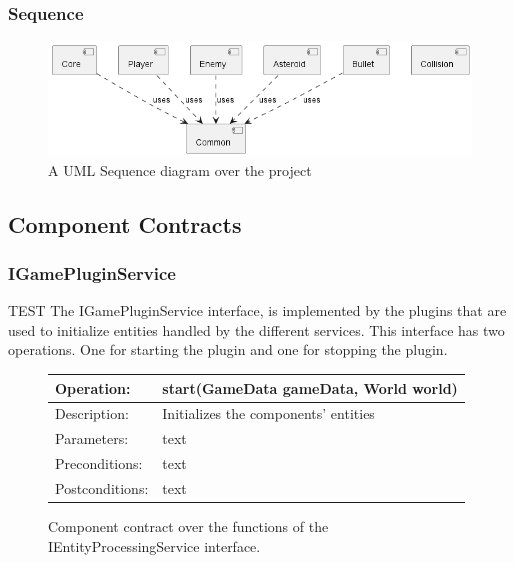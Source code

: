 \subsubsection{Sequence}
\begin{figure}
    \includegraphics[width=\textwidth]{images/diagrams/component.png}
    \caption{A UML Sequence diagram over the project}
\end{figure}

\subsection{Component Contracts}
\subsubsection{IGamePluginService}
TEST
The IGamePluginService interface, is implemented by the plugins that are used to initialize entities handled by the different services.
This interface has two operations. One for starting the plugin and one for stopping the plugin.
\begin{figure}
    \begin{center}
        \begin{tabulary}{1.0\textwidth}{lL}
            \toprule
            Operation:      & start(GameData gameData, World world) \\
            \midrule
            Description:     & Initializes the components' entities  \\
            \midrule
            Parameters:      & text                                  \\
            \midrule
            Preconditions:   & text                                  \\
            \midrule
            Postconditions:  & text                                  \\
            \bottomrule
        \end{tabulary}
    \end{center}
    \caption{Component contract over the functions of the IEntityProcessingService interface.}
\end{figure}

